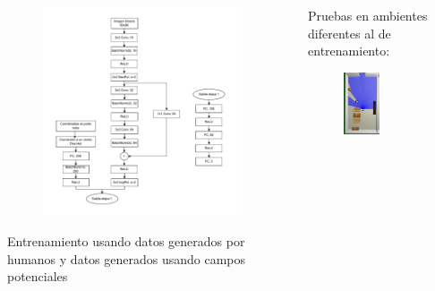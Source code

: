 \begin{frame}
\begin{columns}
\begin{column}{0.4\textwidth}
\begin{figure}
        \includegraphics[width=0.95\textwidth]{Figures/MotionPlanning/DNN.pdf}
      \end{figure}
      Entrenamiento usando datos generados por humanos y datos generados usando campos potenciales
    \end{column}
    \begin{column}{0.35\textwidth}
      Pruebas en ambientes diferentes al de entrenamiento:
      \begin{figure}
        \centering
        \includegraphics[width=0.45\textwidth]{Figures/MotionPlanning/Ambiente1.png}

\end{figure}
\end{column}
\end{columns}
\end{frame}
